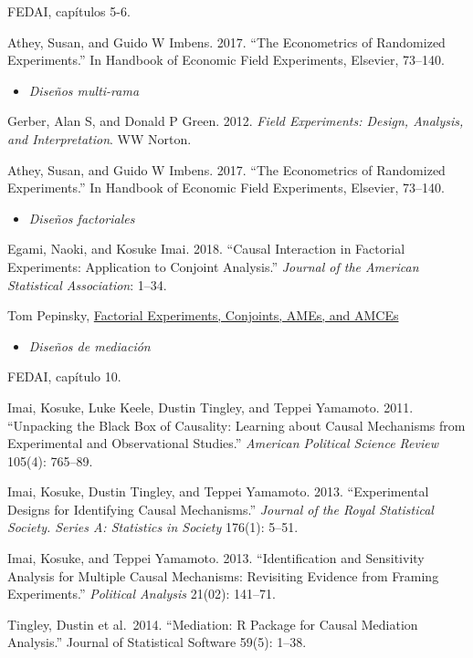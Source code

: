 \documentclass[
  12pt,
]{article}
\providecommand{\tightlist}{%
  \setlength{\itemsep}{0pt}\setlength{\parskip}{0pt}}
\begin{document}
FEDAI, capítulos 5-6.

Athey, Susan, and Guido W Imbens. 2017. ``The Econometrics of Randomized
Experiments.'' In Handbook of Economic Field Experiments, Elsevier,
73--140.

\begin{itemize}
\tightlist
\item
  \emph{Diseños multi-rama}
\end{itemize}

Gerber, Alan S, and Donald P Green. 2012. \emph{Field Experiments:
Design, Analysis, and Interpretation}. WW Norton.

Athey, Susan, and Guido W Imbens. 2017. ``The Econometrics of Randomized
Experiments.'' In Handbook of Economic Field Experiments, Elsevier,
73--140.

\begin{itemize}
\tightlist
\item
  \emph{Diseños factoriales}
\end{itemize}

Egami, Naoki, and Kosuke Imai. 2018. ``Causal Interaction in Factorial
Experiments: Application to Conjoint Analysis.'' \emph{Journal of the
American Statistical Association}: 1--34.

Tom Pepinsky,
\href{https://tompepinsky.com/2022/10/19/factorial-experiments-conjoints-ames-and-amces/}{Factorial
Experiments, Conjoints, AMEs, and AMCEs}

\begin{itemize}
\tightlist
\item
  \emph{Diseños de mediación}
\end{itemize}

FEDAI, capítulo 10.

Imai, Kosuke, Luke Keele, Dustin Tingley, and Teppei Yamamoto. 2011.
``Unpacking the Black Box of Causality: Learning about Causal Mechanisms
from Experimental and Observational Studies.'' \emph{American Political
Science Review} 105(4): 765--89.

Imai, Kosuke, Dustin Tingley, and Teppei Yamamoto. 2013. ``Experimental
Designs for Identifying Causal Mechanisms.'' \emph{Journal of the Royal
Statistical Society. Series A: Statistics in Society} 176(1): 5--51.

Imai, Kosuke, and Teppei Yamamoto. 2013. ``Identification and
Sensitivity Analysis for Multiple Causal Mechanisms: Revisiting Evidence
from Framing Experiments.'' \emph{Political Analysis} 21(02): 141--71.

Tingley, Dustin et al.~2014. ``Mediation: R Package for Causal Mediation
Analysis.'' Journal of Statistical Software 59(5): 1--38.
\end{document}
